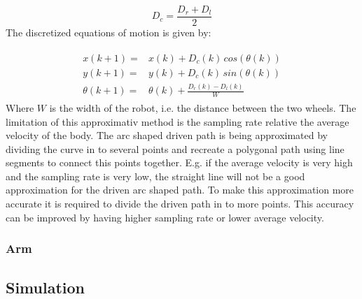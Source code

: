 \begin{equation}
    D_c = \frac{D_r + D_l}{2}
\end{equation}
The discretized equations of motion is given by:

\begin{eqnarray}
\begin{aligned}
    x(k+1) =& x(k) + D_c(k)\,cos(\theta(k))\\
    y(k+1) =& y(k) + D_c(k)\,sin(\theta(k))\\
    \theta(k+1) =& \theta(k) + \frac{D_r(k)-D_l(k)}{W}
\end{aligned}
\end{eqnarray}\label{eq:Disc_EOM}
Where $W$ is the width of the robot, i.e. the distance between the two wheels.
The limitation of this approximativ method is the sampling rate relative the average velocity of the body.
The arc shaped driven path is being approximated by dividing the curve in to several points and recreate a polygonal path using line segments to connect this points together. 
E.g. if the average velocity is very high and the sampling rate is very low, the straight line will not be a good approximation for the driven arc shaped path.
To make this approximation more accurate it is required to divide the driven path in to more points. 
This accuracy can be improved by having higher sampling rate or lower average velocity.

\subsubsection{Arm}

\subsection{Simulation}

